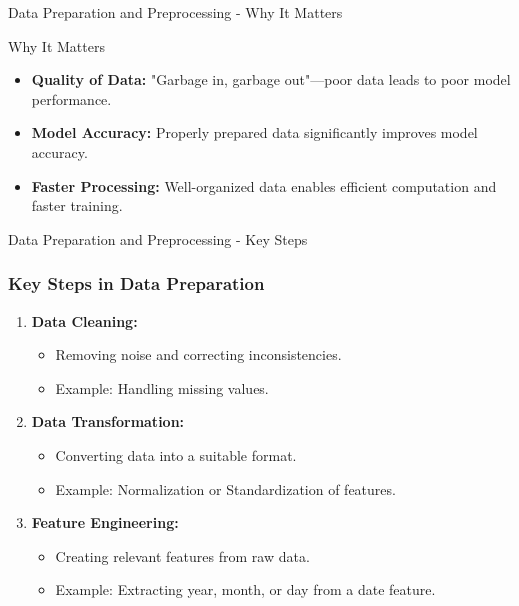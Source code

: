 \documentclass[aspectratio=169]{beamer}
\begin{document}
\begin{frame}[fragile]{Data Preparation and Preprocessing - Why It Matters}
    \begin{block}{Why It Matters}
        \begin{itemize}
            \item \textbf{Quality of Data:} "Garbage in, garbage out"—poor data leads to poor model performance.
            \item \textbf{Model Accuracy:} Properly prepared data significantly improves model accuracy.
            \item \textbf{Faster Processing:} Well-organized data enables efficient computation and faster training.
        \end{itemize}
    \end{block}
\end{frame}

\begin{frame}[fragile]{Data Preparation and Preprocessing - Key Steps}
    \frametitle{Key Steps in Data Preparation}
    \begin{enumerate}
        \item \textbf{Data Cleaning:}
            \begin{itemize}
                \item Removing noise and correcting inconsistencies.
                \item Example: Handling missing values.
            \end{itemize}
            
        \item \textbf{Data Transformation:}
            \begin{itemize}
                \item Converting data into a suitable format.
                \item Example: Normalization or Standardization of features.
            \end{itemize}
            
        \item \textbf{Feature Engineering:}
            \begin{itemize}
                \item Creating relevant features from raw data.
                \item Example: Extracting year, month, or day from a date feature.
            \end{itemize}
    \end{enumerate}
\end{frame}
\end{document}
